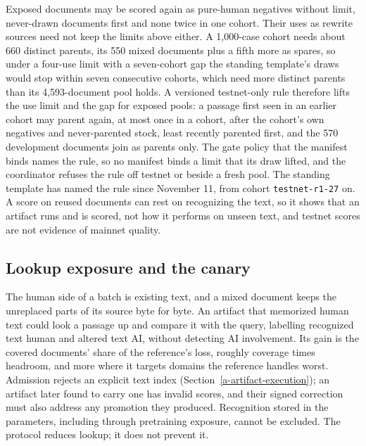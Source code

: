 Exposed documents may be scored again as pure-human negatives without limit,
never-drawn documents first and none twice in one cohort. Their uses as
rewrite sources need not keep the limits above either. A 1,000-case cohort
needs about 660 distinct parents, its 550 mixed documents plus a fifth more as
spares, so under a four-use
limit with a seven-cohort gap the standing template's draws would stop within
seven consecutive cohorts, which need more distinct parents than its
4,593-document pool holds. A versioned testnet-only rule therefore lifts the
use limit and the gap for exposed pools: a passage first seen in an earlier
cohort may parent again, at most once in a cohort, after the cohort's own
negatives and never-parented stock, least recently parented first, and the 570
development documents join as parents only. The gate policy that the manifest
binds names the rule, so no manifest binds a limit that its draw lifted, and
the coordinator refuses the rule off testnet or beside a fresh pool. The
standing template has named the rule since November 11, from cohort
\texttt{testnet-r1-27} on. A
score on reused documents can rest on recognizing the text, so it shows that
an artifact runs and is scored, not how it performs on unseen text, and
testnet scores are not evidence of mainnet quality.

\subsection{Lookup exposure and the canary}\label{lookup-exposure}

The human side of a batch is existing text, and a mixed document keeps the
unreplaced parts of its source byte for byte. An artifact that memorized human
text could look a passage up and compare it with the query, labelling
recognized text human and altered text AI, without detecting AI involvement.
Its gain is the covered documents' share of the reference's loss, roughly
coverage times headroom, and more where it targets domains the reference
handles worst. Admission rejects an explicit text index
(Section~\ref{a-artifact-execution}); an artifact later found to carry one has
invalid scores, and their signed correction must also address any promotion
they produced. Recognition stored in the parameters, including through
pretraining exposure, cannot be excluded. The protocol reduces lookup; it does
not prevent it.

